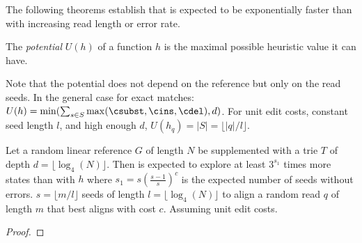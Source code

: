 The following theorems establish that \seedh is expected to be exponentially
faster than \seedh with increasing read length or error rate.

\begin{definition}
    The \textit{potential} $U(h)$ of a \seedh function $h$ is the maximal
    possible heuristic value it can have. 
\end{definition}

Note that the potential does not depend on the reference but only on the read
seeds. In the general case for exact matches: $U(h) = \min(\sum_{s \in S}
\max(\csubst, \cins, \cdel), d)$. For unit edit costs, constant seed length $l$,
and high enough $d$, $U(h_q) = \lvert S \rvert = \lfloor \lvert q \rvert / l
\rfloor$.

\begin{theorem}
    Let a random linear reference $G$ of length $N$ be supplemented with a trie
    $T$ of depth $d=\lfloor \log_4(N) \rfloor$. Then \dijkstra is expected to
    explore at least $3^{s_1}$ times more states than \A with \seedh $h$ where
    $s_1=s{(\frac{s-1}{s})}^c$ is the expected number of seeds without errors. $s=\lfloor m/l
    \rfloor$ seeds of length $l=\lfloor \log_4(N) \rfloor$ to align a random
    read $q$ of length $m$ that best aligns with cost $c$. Assuming unit edit
    costs.
\end{theorem}
\begin{proof}
\end{proof}

